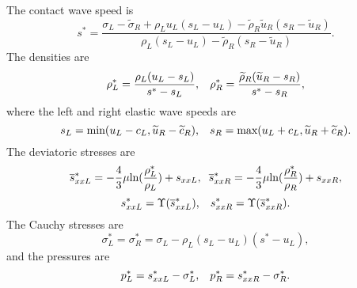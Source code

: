 \documentclass{article}
\theoremstyle{plain}\newtheorem{definition}{\sc{Definition}}
\theoremstyle{defination}\newtheorem{example}{Example}[section]
\numberwithin{equation}{section}
\numberwithin{table}{section}
\begin{document}
The contact wave speed is 
\begin{equation}
  s^* = \frac{\sigma_L-\widetilde{\sigma}_R+\rho_L u_L(s_L-u_L)-\widetilde{\rho}_R \widetilde{u}_R(s_R-\widetilde{u}_R)}{\rho_L(s_L-u_L)-\widetilde{\rho}_R(s_R-\widetilde{u}_R)}.
\end{equation}
The densities are
\begin{equation}\label{eq:rhoLs}
  \rho_L^* = \frac{\rho_L(u_L-s_L)}{s^*-s_L}, \hspace{0.3cm}  \rho_R^* = \frac{\widetilde{\rho}_R(\widetilde{u}_R-s_R)}{s^*-s_R},
\end{equation}
where the left and right elastic wave speeds are
	\begin{equation}
	  s_L = \text{min} (u_L-c_L, \widetilde{u}_R-\widetilde{c}_R), \hspace{0.3cm} s_R = \text{max}(u_L+c_L, \widetilde{u}_R+\widetilde{c}_R).
	\end{equation}
	The deviatoric stresses are 
\begin{equation}
  \overline{s}_{xxL}^*=-\frac{4}{3}\mu\text{ln}(\frac{\rho_L^*}{\rho_L})+s_{xxL},\hspace{0.2cm}  \overline{s}_{xxR}^*=-\frac{4}{3}\mu\text{ln}(\frac{\rho_R^*}{\rho_R})+s_{xxR},
\end{equation}
\begin{equation}
  s_{xxL}^* = \Upsilon(\overline{s}_{xxL}^*), \hspace{0.3cm}  s_{xxR}^* = \Upsilon(\overline{s}_{xxR}^*). 
\end{equation}
The Cauchy stresses are
\begin{equation}
  \sigma_L^*=\sigma_R^*=\sigma_L -\rho_L (s_L-u_L)(s^*-u_L),
\end{equation}
and the pressures are 
\begin{equation}
  p_L^* = s_{xxL}^* - \sigma_L^*, \hspace{0.3cm}   p_R^* = s_{xxR}^* - \sigma_R^*.
\end{equation}
\end{document}

